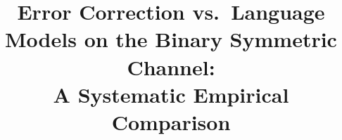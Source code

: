 \documentclass[conference]{IEEEtran}
\title{Error Correction vs.\ Language Models on the Binary Symmetric Channel:\\
       A Systematic Empirical Comparison}
\author{%
  \IEEEauthorblockN{Baris Atakan}
  \IEEEauthorblockA{\textit{Izmir Institute of Technology}} \and
  \IEEEauthorblockN{Burcu Baris}
  \IEEEauthorblockA{\textit{PhD Candidate}} \and
  \IEEEauthorblockN{Can Rollas}
  \IEEEauthorblockA{\textit{MSc Candidate}} \and
  \IEEEauthorblockN{Arda Tanil Kersu}
  \IEEEauthorblockA{\textit{MSc Candidate}}
}
\begin{document}
\maketitle

\begin{abstract}
  
\end{abstract}










\end{document}
